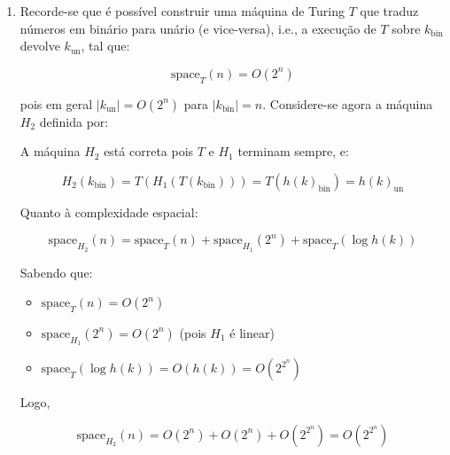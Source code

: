 \documentclass[a4paper,12pt]{article}
\begin{document}
\begin{enumerate}[label=\alph*)]
  \vspace{0.5cm}
  \item 
  Recorde-se que é possível construir uma máquina de Turing \(T\) que traduz números em binário para unário (e vice-versa), i.e., a execução de \(T\) sobre \(k_{\text{bin}}\) devolve \(k_{\text{un}}\), tal que:

  \[
  \text{space}_T(n) = O(2^n)
  \]

  pois em geral \(|k_{\text{un}}| = O(2^n)\) para \(|k_{\text{bin}}| = n\). Considere-se agora a máquina \(H_2\) definida por:

  \begin{center}
  \end{center}

  A máquina \(H_2\) está correta pois \(T\) e \(H_1\) terminam sempre, e:

  \[
  H_2(k_{\text{bin}}) = T(H_1(T(k_{\text{bin}}))) = T(h(k)_{\text{bin}}) = h(k)_{\text{un}}
  \]

  Quanto à complexidade espacial:

  \[
  \text{space}_{H_2}(n) = \text{space}_T(n) + \text{space}_{H_1}(2^n) + \text{space}_T(\log h(k))
  \]

  Sabendo que:

  \begin{itemize}
    \item \(\text{space}_T(n) = O(2^n)\)
    \item \(\text{space}_{H_1}(2^n) = O(2^n)\) (pois \(H_1\) é linear)
    \item \(\text{space}_T(\log h(k)) = O(h(k)) = O(2^{2^n})\)
  \end{itemize}

  Logo,

  \[
  \text{space}_{H_2}(n) = O(2^n) + O(2^n) + O(2^{2^n}) = O(2^{2^n})
  \]

\end{enumerate}
\end{document}
